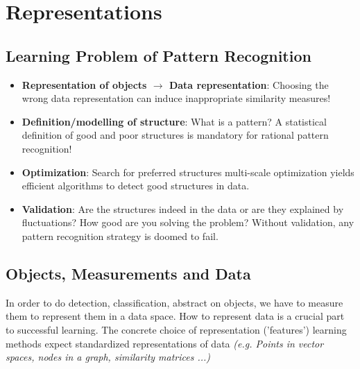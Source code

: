 \documentclass[main]{subfiles}
\begin{document}
\setcounter{section}{1}
\section{Representations}


\subsection{Learning Problem of Pattern Recognition}

\begin{itemize}
\item \textbf{Representation of objects $\rightarrow$ Data representation}:
Choosing the wrong data representation can induce inappropriate similarity
measures!
\item \textbf{Definition/modelling of structure}: What is a pattern?
A statistical definition of good and poor structures is mandatory for rational
pattern recognition!
\item \textbf{Optimization}: Search for preferred structures multi-scale optimization yields efficient algorithms to detect good structures in
data.
\item \textbf{Validation}: Are the structures indeed in the data or are
they explained by fluctuations? How good are you solving the problem?
Without validation, any pattern recognition strategy is doomed to fail.
\end{itemize}

\subsection{Objects, Measurements and Data}

In order to do detection, classification, abstract on objects, we have to measure them to represent them in a data space. How to represent data is a crucial part to successful learning. The concrete choice of representation ('features') learning methods expect standardized representations of data {\color{orange}\emph{(e.g. Points in vector spaces, nodes in a graph, similarity matrices ...)}}
\end{document}
